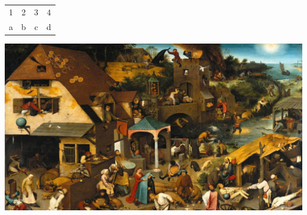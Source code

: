 \documentclass{article}
\begin{document}
\begin{tabular}{ | c | c | c | c | }
	1 & 2 & 3 & 4\\
	a & b & c & d
\end{tabular}
\includegraphics[scale=0.15]{proverbs.jpg}
\end{document}
